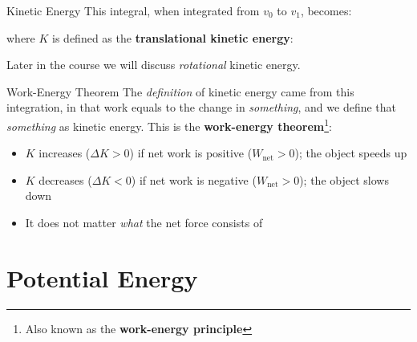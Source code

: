 \documentclass[12pt,compress,aspectratio=169]{beamer}
\begin{document}
\begin{frame}{Kinetic Energy}
  This integral, when integrated from $v_0$ to $v_1$, becomes:

  
  where $K$ is defined as the \textbf{translational kinetic energy}:


  Later in the course we will discuss \emph{rotational} kinetic energy.
\end{frame}



\begin{frame}{Work-Energy Theorem}
  The \emph{definition} of kinetic energy came from this integration, in that
  work equals to the change in \emph{something}, and we define that
  \emph{something} as kinetic energy. This is the
  \textbf{work-energy theorem}\footnote{Also known as the
  \textbf{work-energy principle}}:

  \begin{itemize}
  \item $K$ increases ($\Delta K>0$) if net work is positive ($W_\text{net}>0$);
    the object speeds up
  \item $K$ decreases ($\Delta K<0$) if net work is negative ($W_\text{net}>0$);
    the object slows down
  \item It does not matter \emph{what} the net force consists of
  \end{itemize}
\end{frame}






\section{Potential Energy}
\end{document}
